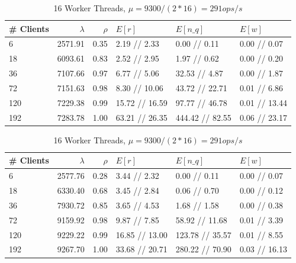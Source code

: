\documentclass[11pt,a4paper]{article}
\begin{document}
\begin{table}
    \begin{subtable}{1.0\linewidth}\centering
        \begin{tabular}{lrrlll}
        \hline
        \# Clients &  $\lambda$ &  $\rho$ &         $E[r]$ &        $E[n\_q]$ &        $E[w]$ \\
        \hline
          6 &    2571.91 &    0.35 &    2.19 // 2.33 &     0.00 // 0.11 &   0.00 // 0.07 \\
         18 &    6093.61 &    0.83 &    2.52 // 2.95 &     1.97 // 0.62 &   0.00 // 0.20 \\
         36 &    7107.66 &    0.97 &    6.77 // 5.06 &    32.53 // 4.87 &   0.00 // 1.87 \\
         72 &    7151.63 &    0.98 &   8.30 // 10.06 &   43.72 // 22.71 &   0.01 // 6.86 \\
        120 &    7229.38 &    0.99 &  15.72 // 16.59 &   97.77 // 46.78 &  0.01 // 13.44 \\
        192 &    7283.78 &    1.00 &  63.21 // 26.35 &  444.42 // 82.55 &  0.06 // 23.17 \\
        \hline
        \end{tabular}
        \caption{8 Worker Threads, $\mu = 7300 / (2*8) = 456 ops/s$}
    \end{subtable}
    \begin{subtable}{1.0\linewidth}\centering
        \begin{tabular}{lrrlll}
        \hline
        \# Clients &  $\lambda$ &  $\rho$ &         $E[r]$ &        $E[n\_q]$ &        $E[w]$ \\
        \hline
          6 &    2577.76 &    0.28 &    3.44 // 2.32 &     0.00 // 0.11 &   0.00 // 0.07 \\
         18 &    6330.40 &    0.68 &    3.45 // 2.84 &     0.06 // 0.70 &   0.00 // 0.12 \\
         36 &    7930.72 &    0.85 &    3.65 // 4.53 &     1.68 // 1.58 &   0.00 // 0.38 \\
         72 &    9159.92 &    0.98 &    9.87 // 7.85 &   58.92 // 11.68 &   0.01 // 3.39 \\
        120 &    9229.22 &    0.99 &  16.85 // 13.00 &  123.78 // 35.57 &   0.01 // 8.55 \\
        192 &    9267.70 &    1.00 &  33.68 // 20.71 &  280.22 // 70.90 &  0.03 // 16.13 \\
        \hline
        \end{tabular}
        \caption{16 Worker Threads, $\mu = 9300 / (2*16) = 291 ops/s$}
    \end{subtable}
    

\end{table}
\end{document}
